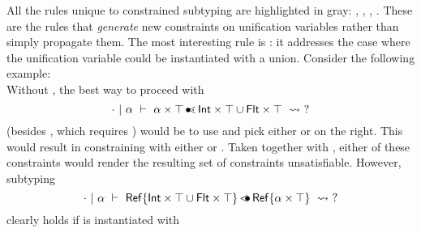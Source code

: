 All the rules unique to constrained subtyping are highlighted in gray:
, , , .
These are the rules that \emph{generate} new constraints on unification
variables rather than simply propagate them.
The most interesting rule is : it addresses the case
where the unification variable could be instantiated with a union.
Consider the following example:\\
Without , the best way to proceed with
\[
    \cdot~\vert~\alpha\ \vdash\ \alpha \times \top \operatorname{\bullet\!\!\lessdot} \mathsf{Int} \times \top \cup \mathsf{Flt} \times \top\ \rightsquigarrow\ ?
\]
(besides , which requires \ctrsngl{\va}{\tybot})
would be to use  and pick either \typair{\tyint}{\tyany}
or \typair{\tyflt}{\tyany} on the right. This would result in constraining \va 
with either \ctrsngl{\va}{\tyint} or \ctrsngl{\va}{\tyflt}.
Taken together with \ctrset{\ctrsub{\tyint}{\va}, \ctrsub{\tyflt}{\va}},
either of these constraints would render the resulting set of constraints
unsatisfiable.
However, subtyping
\[
    \cdot~\vert~\alpha\ \vdash\ \mathsf{Ref}\{\mathsf{Int} \times \top \cup \mathsf{Flt} \times \top\} \operatorname{\lessdot\!\!\bullet} \mathsf{Ref}\{\alpha \times \top\}\ \rightsquigarrow\ ?
\]
clearly holds if \va is instantiated with
